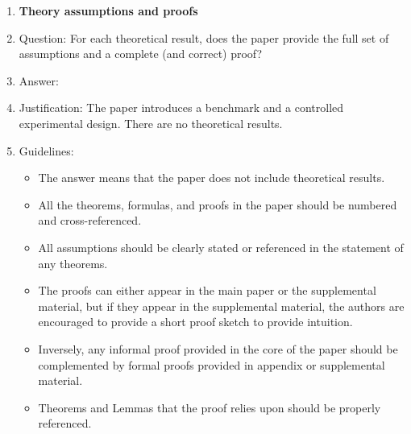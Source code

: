 \begin{enumerate}
\begin{itemize}
        \item While the authors might fear that complete honesty about limitations might be used by reviewers as grounds for rejection, a worse outcome might be that reviewers discover limitations that aren't acknowledged in the paper. The authors should use their best judgment and recognize that individual actions in favor of transparency play an important role in developing norms that preserve the integrity of the community. Reviewers will be specifically instructed to not penalize honesty concerning limitations.
    \end{itemize}

\item {\bf Theory assumptions and proofs}
    \item[] Question: For each theoretical result, does the paper provide the full set of assumptions and a complete (and correct) proof?
    \item[] Answer: \answerNA{}
    \item[] Justification: The paper introduces a benchmark and a controlled experimental design. There are no theoretical results.
    \item[] Guidelines:
    \begin{itemize}
        \item The answer \answerNA{} means that the paper does not include theoretical results. 
        \item All the theorems, formulas, and proofs in the paper should be numbered and cross-referenced.
        \item All assumptions should be clearly stated or referenced in the statement of any theorems.
        \item The proofs can either appear in the main paper or the supplemental material, but if they appear in the supplemental material, the authors are encouraged to provide a short proof sketch to provide intuition. 
        \item Inversely, any informal proof provided in the core of the paper should be complemented by formal proofs provided in appendix or supplemental material.
        \item Theorems and Lemmas that the proof relies upon should be properly referenced. 
    \end{itemize}


\end{enumerate}
